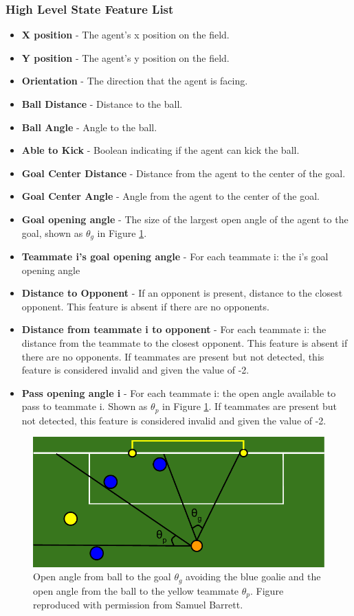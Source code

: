 \documentclass[12pt]{article}
\begin{document}
\subsubsection{High Level State Feature List}
\begin{itemize}
\item{\textbf{X position} - The agent’s x position on the field.}
\item{\textbf{Y position} - The agent’s y position on the field.}
\item{\textbf{Orientation} - The direction that the agent is facing.}
\item{\textbf{Ball Distance} - Distance to the ball.}
\item{\textbf{Ball Angle} - Angle to the ball.}
\item{\textbf{Able to Kick} - Boolean indicating if the agent can kick the ball.}
\item{\textbf{Goal Center Distance} - Distance from the agent to the center of the goal.}
\item{\textbf{Goal Center Angle} - Angle from the agent to the center of the goal.}
\item{\textbf{Goal opening angle} - The size of the largest open angle
  of the agent to the goal, shown as $\theta_g$ in Figure
  \ref{fig:openAngle}.}
\item{\textbf{Teammate i's goal opening angle} - For each teammate i:
  the i’s goal opening angle}
\item{\textbf{Distance to Opponent} - If an opponent is present,
  distance to the closest opponent. This feature is absent if there
  are no opponents.}
\item{\textbf{Distance from teammate i to opponent} - For each
  teammate i: the distance from the teammate to the closest
  opponent. This feature is absent if there are no opponents. If
  teammates are present but not detected, this feature is considered
  invalid and given the value of -2.}
\item{\textbf{Pass opening angle i} - For each teammate i: the open
  angle available to pass to teammate i. Shown as $\theta_p$ in Figure
  \ref{fig:openAngle}. If teammates are present but not detected, this
  feature is considered invalid and given the value of -2.}
\end{itemize}

\begin{figure}[htp]
  \centering
  \includegraphics[width=.75\textwidth]{figures/openAngle}
  \caption{Open angle from ball to the goal $\theta_g$ avoiding the
    blue goalie and the open angle from the ball to the yellow
    teammate $\theta_p$. Figure reproduced with permission from Samuel
    Barrett.}
  \label{fig:openAngle}
\end{figure}
\end{document}
